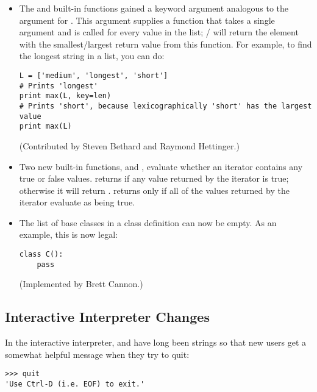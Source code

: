\documentclass{howto}
\begin{document}
\begin{itemize}

\item The  and  built-in functions
gained a  keyword argument analogous to the 
argument for .  This argument supplies a function
that takes a single argument and is called for every value in the list; 
/ will return the element with the 
smallest/largest return value from this function.
For example, to find the longest string in a list, you can do:

\begin{verbatim}
L = ['medium', 'longest', 'short']
# Prints 'longest'
print max(L, key=len)		   
# Prints 'short', because lexicographically 'short' has the largest value
print max(L)         
\end{verbatim}

(Contributed by Steven Bethard and Raymond Hettinger.)

\item Two new built-in functions,  and
, evaluate whether an iterator contains any true or
false values.   returns  if any value
returned by the iterator is true; otherwise it will return
.   returns  only if
all of the values returned by the iterator evaluate as being true.



\item The list of base classes in a class definition can now be empty.  
As an example, this is now legal:

\begin{verbatim}
class C():
    pass
\end{verbatim}
(Implemented by Brett Cannon.)

\end{itemize}


\subsection{Interactive Interpreter Changes}

In the interactive interpreter,  and  
have long been strings so that new users get a somewhat helpful message
when they try to quit:

\begin{verbatim}
>>> quit
'Use Ctrl-D (i.e. EOF) to exit.'
\end{verbatim}
\end{document}
